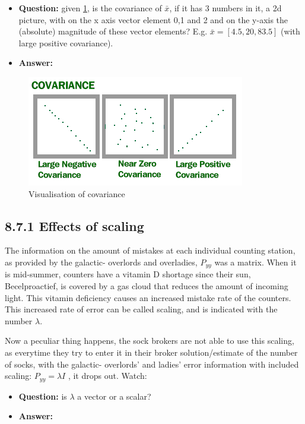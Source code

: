 \begin{itemize}
    \item \textbf{Question:} given \cref{fig:covariance}, is the covariance of $\bar{x}$, if it has 3 numbers in it, a 2d picture, with on the x axis vector element 0,1 and 2 and on the y-axis the (absolute) magnitude of these vector elements? E.g. $\bar{x}=[4.5,20,83.5]$ (with large positive covariance).
    \item \textbf{Answer:}
\end{itemize}
\begin{figure}
    \centering
    \includegraphics{images/covariance.png}
    \caption{Visualisation of covariance}
    \label{fig:covariance}
\end{figure}


\subsection{8.7.1 Effects of scaling}
The information on the amount of mistakes at each individual counting station, as provided by the galactic- overlords and overladies, $P_{yy}$ was a matrix. When it is mid-summer, counters have a vitamin D shortage since their sun, Becelproactief, is covered by a gas cloud that reduces the amount of incoming light. This vitamin deficiency causes an increased mistake rate of the counters. This increased rate of error can be called scaling, and is indicated with the number $\lambda$. 

Now a peculiar thing happens, the sock brokers are not able to use this scaling, as everytime they try to enter it in their broker solution/estimate of the number of socks, with the galactic- overlords' and ladies' error information with included scaling: $P_{yy}=\lambda I$ , it drops out. Watch:


\begin{itemize}
    \item \textbf{Question:} is $\lambda$ a vector or a scalar?
    \item \textbf{Answer:}
\end{itemize}

